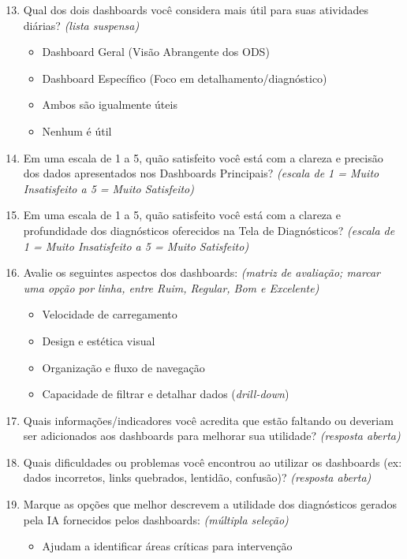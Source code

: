 \begin{enumerate}
    \setcounter{enumi}{12}
    \item Qual dos dois dashboards você considera mais útil para suas atividades diárias? \textit{(lista suspensa)}
    \begin{itemize}
        \item Dashboard Geral (Visão Abrangente dos ODS)
        \item Dashboard Específico (Foco em detalhamento/diagnóstico)
        \item Ambos são igualmente úteis
        \item Nenhum é útil
    \end{itemize}
    \item Em uma escala de 1 a 5, quão satisfeito você está com a clareza e precisão dos dados apresentados nos Dashboards Principais? \textit{(escala de 1 = Muito Insatisfeito a 5 = Muito Satisfeito)}
    \item Em uma escala de 1 a 5, quão satisfeito você está com a clareza e profundidade dos diagnósticos oferecidos na Tela de Diagnósticos? \textit{(escala de 1 = Muito Insatisfeito a 5 = Muito Satisfeito)}
    \item Avalie os seguintes aspectos dos dashboards: \textit{(matriz de avaliação; marcar uma opção por linha, entre Ruim, Regular, Bom e Excelente)}
    \begin{itemize}
        \item Velocidade de carregamento
        \item Design e estética visual
        \item Organização e fluxo de navegação
        \item Capacidade de filtrar e detalhar dados (\textit{drill-down})
    \end{itemize}
    \item Quais informações/indicadores você acredita que estão faltando ou deveriam ser adicionados aos dashboards para melhorar sua utilidade? \textit{(resposta aberta)}
    \item Quais dificuldades ou problemas você encontrou ao utilizar os dashboards (ex: dados incorretos, links quebrados, lentidão, confusão)? \textit{(resposta aberta)}
    \item Marque as opções que melhor descrevem a utilidade dos diagnósticos gerados pela IA fornecidos pelos dashboards: \textit{(múltipla seleção)}
    \begin{itemize}
        \item Ajudam a identificar áreas críticas para intervenção

\end{itemize}
\end{enumerate}
